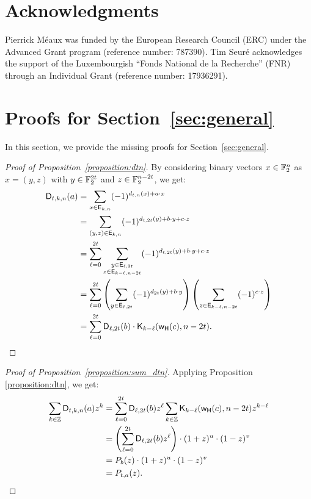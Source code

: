 \documentclass{llncs}
\begin{document}
\ifnum{}
	\section{Acknowledgments}
	Pierrick Méaux was funded by the European Research Council (\textsf{ERC}) under the Advanced Grant program (reference number: 787390). Tim Seuré acknowledges the support of the Luxembourgish “Fonds National de la Recherche” (\textsf{FNR}) through an Individual Grant (reference number: 17936291).
\fi

\newpage




\appendix

\section{Proofs for Section~\ref{sec:general}}\label{sec:proofs}

In this section, we provide the missing proofs for Section~\ref{sec:general}.

\begin{proof}[Proof of Proposition~\ref{proposition:dtn}]
    By considering binary vectors $x\in\mathbb{F}_2^n$ as $x=(y,z)$ with $y\in\mathbb{F}_2^{2t}$ and $z\in\mathbb{F}_2^{n-2t}$, we get:	
	\begin{align*}
		\mathsf{D}_{t,k,n}(a)&=\sum_{x \in \mathsf{E}_{k,n}} (-1)^{d_{t,n}(x)+a \cdot x}\\
		&=\sum_{(y,z)\in\mathsf{E}_{k,n}} (-1)^{d_{t,2t}(y)+b \cdot y +c \cdot z}\\
		&=\sum_{\ell=0}^{2t} \sum_{\substack{y \in \mathsf{E}_{\ell,2t}\\z \in \mathsf{E}_{k-\ell,n-2t}}} (-1)^{d_{t,2t}(y)+b \cdot y +c \cdot z}\\
		&=\sum_{\ell=0}^{2t}\left(\sum_{y \in \mathsf{E}_{\ell,2t}} (-1)^{d_{2t}(y)+b \cdot y}\right)\left( \sum_{z \in \mathsf{E}_{k-\ell,n-2t}} (-1)^{c \cdot z}\right)\\&=\sum_{\ell=0}^{2t} \mathsf{D}_{\ell,2t}(b)\cdot\mathsf{K}_{k-\ell}(\mathsf{w_H}(c),n-2t).\qedhere
	\end{align*}
\end{proof}

\begin{proof}[Proof of Proposition~\ref{proposition:sum_dtn}]
    Applying Proposition \ref{proposition:dtn}, we get:
    \begin{align*}
        \sum_{k\in\mathbb{Z}}\mathsf{D}_{t,k,n}(a)z^k&=\sum_{\ell=0}^{2t}\mathsf{D}_{\ell,2t}(b)z^\ell\sum_{k\in\mathbb{Z}}\mathsf{K}_{k-\ell}(\mathsf{w_H}(c),n-2t)z^{k-\ell}\\
        &=\left(\sum_{\ell=0}^{2t}\mathsf{D}_{\ell,2t}(b)z^\ell\right)\cdot(1+z)^u\cdot(1-z)^v\\
        &=P_b(z)\cdot(1+z)^u\cdot(1-z)^v\\
        &=P_{t,a}(z).\qedhere
    \end{align*}
\end{proof}
\end{document}

